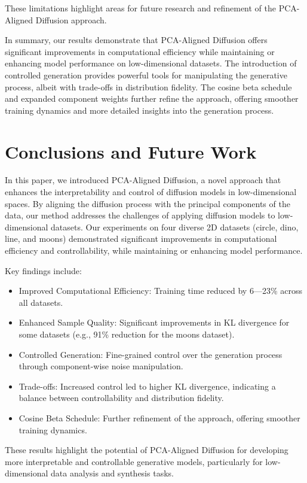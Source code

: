 \documentclass{article} %
\begin{document}
These limitations highlight areas for future research and refinement of the PCA-Aligned Diffusion approach.

In summary, our results demonstrate that PCA-Aligned Diffusion offers significant improvements in computational efficiency while maintaining or enhancing model performance on low-dimensional datasets. The introduction of controlled generation provides powerful tools for manipulating the generative process, albeit with trade-offs in distribution fidelity. The cosine beta schedule and expanded component weights further refine the approach, offering smoother training dynamics and more detailed insights into the generation process.

\section{Conclusions and Future Work}
\label{sec:conclusion}

In this paper, we introduced PCA-Aligned Diffusion, a novel approach that enhances the interpretability and control of diffusion models in low-dimensional spaces. By aligning the diffusion process with the principal components of the data, our method addresses the challenges of applying diffusion models to low-dimensional datasets. Our experiments on four diverse 2D datasets (circle, dino, line, and moons) demonstrated significant improvements in computational efficiency and controllability, while maintaining or enhancing model performance.

Key findings include:
\begin{itemize}
    \item Improved Computational Efficiency: Training time reduced by 6---23\% across all datasets.
    \item Enhanced Sample Quality: Significant improvements in KL divergence for some datasets (e.g., 91\% reduction for the moons dataset).
    \item Controlled Generation: Fine-grained control over the generation process through component-wise noise manipulation.
    \item Trade-offs: Increased control led to higher KL divergence, indicating a balance between controllability and distribution fidelity.
    \item Cosine Beta Schedule: Further refinement of the approach, offering smoother training dynamics.
\end{itemize}

These results highlight the potential of PCA-Aligned Diffusion for developing more interpretable and controllable generative models, particularly for low-dimensional data analysis and synthesis tasks.
\end{document}
